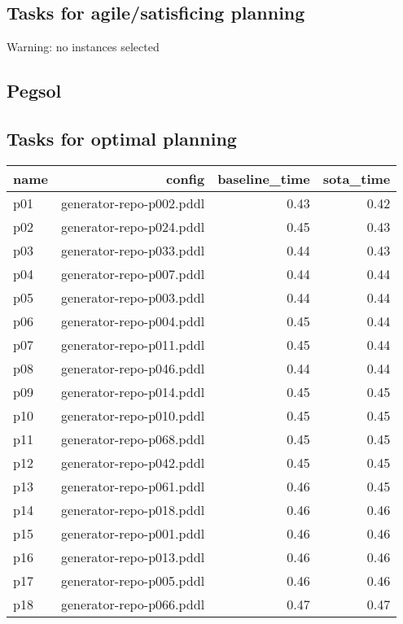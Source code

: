 \documentclass{article}
\begin{document}
                    \subsection*{Tasks for agile/satisficing planning}
                    Warning: no instances selected
                \newpage \subsection{Pegsol}
                    \subsection*{Tasks for optimal planning}
                    
                            \begin{center}
                            \scriptsize
                            \begin{tabular}{@{}l|r|r|r@{}}
                            name & config & baseline\_time & sota\_time\\\midrule
                              p01& generator-repo-p002.pddl&0.43&0.42\\
  p02& generator-repo-p024.pddl&0.45&0.43\\
  p03& generator-repo-p033.pddl&0.44&0.43\\
  p04& generator-repo-p007.pddl&0.44&0.44\\
  p05& generator-repo-p003.pddl&0.44&0.44\\
  p06& generator-repo-p004.pddl&0.45&0.44\\
  p07& generator-repo-p011.pddl&0.45&0.44\\
  p08& generator-repo-p046.pddl&0.44&0.44\\
  p09& generator-repo-p014.pddl&0.45&0.45\\
  p10& generator-repo-p010.pddl&0.45&0.45\\
  p11& generator-repo-p068.pddl&0.45&0.45\\
  p12& generator-repo-p042.pddl&0.45&0.45\\
  p13& generator-repo-p061.pddl&0.46&0.45\\
  p14& generator-repo-p018.pddl&0.46&0.46\\
  p15& generator-repo-p001.pddl&0.46&0.46\\
  p16& generator-repo-p013.pddl&0.46&0.46\\
  p17& generator-repo-p005.pddl&0.46&0.46\\
  p18& generator-repo-p066.pddl&0.47&0.47\\

\end{tabular}
\end{center}
\end{document}

